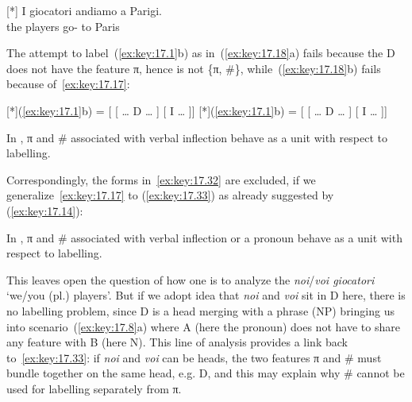 \documentclass[output=paper]{langsci/langscibook}
\begin{document}
\begin{exe}
    \exi{\eqref{ex:key:17.1}}
    \begin{xlist}
    [*]{%
    \gll I giocatori andiamo a Parigi.\\
    the players go-\Fpl{} to Paris\\
    \glt}
    \end{xlist}
\end{exe}
The attempt to label~(\ref{ex:key:17.1}b) as in~(\ref{ex:key:17.18}a) fails
because the D does not have the feature π, hence is not \{π, \#\},
while~(\ref{ex:key:17.18}b) fails because of~\eqref{ex:key:17.17}:

\begin{exe}
\exi{\eqref{ex:key:17.18}}
\begin{xlist}
    [*]{(\ref{ex:key:17.1}b) = [\tss{\{} [ \dots{} D\tss{\#} \dots{} ] [ I\tss{\{}\tss{,\#\}} \dots{} ]]}
    [*]{(\ref{ex:key:17.1}b)  = [ [ \dots{} D\tss{\#} \dots{} ] [ I\tss{\{}\tss{,\#\}} \dots{} ]]}
\end{xlist}
\end{exe}

\begin{exe}
\exi{\eqref{ex:key:17.17}}
    In , π and \# associated with verbal inflection behave as a unit
    with respect to labelling.
\end{exe}
Correspondingly, the forms in~\eqref{ex:key:17.32} are excluded, if we
generalize~\eqref{ex:key:17.17} to (\ref{ex:key:17.33}) as already suggested by
(\ref{ex:key:17.14}):

\ea\label{ex:key:17.33}
    In , π and \# associated with verbal inflection or a pronoun behave
    as a unit with respect to labelling.
\z

\ea\label{ex:key:17.34}
    \z
\z
This leaves open the question of how one is to analyze the 
\emph{noi}/\emph{voi giocatori} ‘we/you (pl.) players’. But if we adopt
 idea that \emph{noi} and \emph{voi} sit in D here, there is
no labelling problem, since D is a head merging with a phrase
(NP) bringing us into scenario~(\ref{ex:key:17.8}a) where A (here the pronoun)
does not have to share any feature with B (here N). This line of analysis
provides a link back to~\eqref{ex:key:17.33}: if \emph{noi} and \emph{voi} can
be heads, the two features π and \# must bundle together on the same head, e.g.
D, and this may explain why \# cannot be used for labelling
separately from π.
\end{document}
